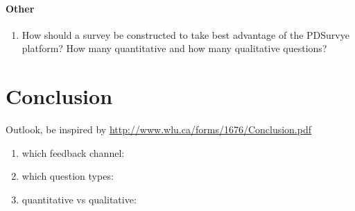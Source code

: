 \paragraph{Other}
	\begin{enumerate}
	\item How should a survey be constructed to take best advantage of the PDSurvye platform? How many quantitative and how many qualitative questions?
	\end{enumerate}







\section{Conclusion}
\label{sec:conclusion}

	Outlook, be inspired by \url{http://www.wlu.ca/forms/1676/Conclusion.pdf}

		\begin{enumerate}
		\item which feedback channel:
		\item which question types: 
		\item quantitative vs qualitative: 
		\end{enumerate}


